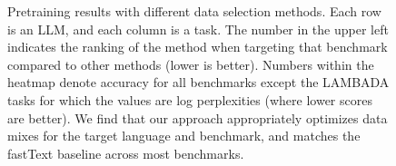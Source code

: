 \documentclass{article} %
\begin{document}
\begin{figure}[t]
\centering
{}
\caption{Pretraining results with different data selection methods. Each row is an LLM, and each column is a task. The number in the upper left indicates the ranking of the method when targeting that benchmark compared to other methods (lower is better). Numbers within the heatmap denote accuracy for all benchmarks except the LAMBADA tasks for which the values are  log perplexities (where lower scores are better). We find that our approach appropriately optimizes data mixes for the target language and benchmark, and matches the fastText baseline across most benchmarks.}
\label{pretraining_figure}
\end{figure}
\end{document}
